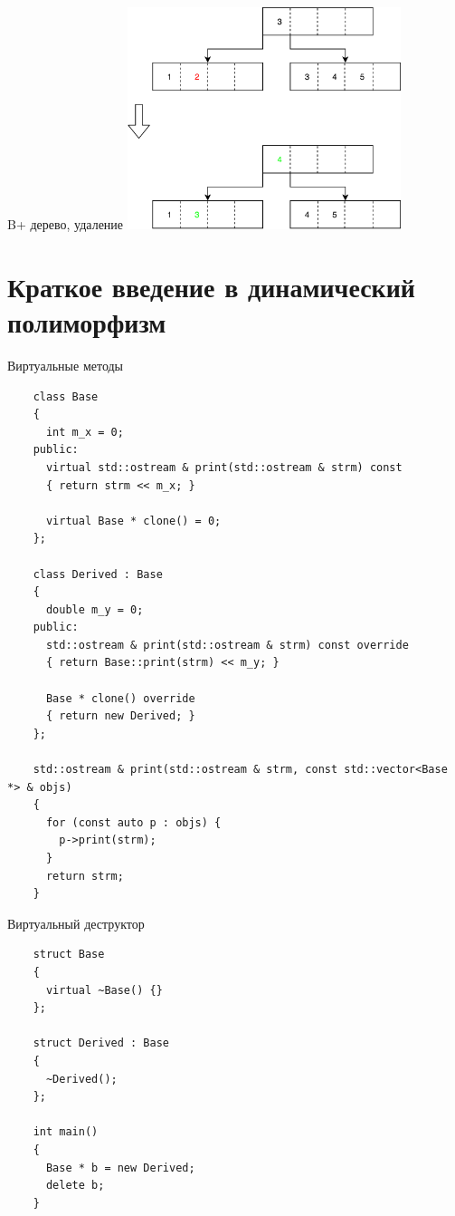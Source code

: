 \documentclass[unknownkeysallowed,xcolor=table]{beamer}
\begin{document}
\begin{frame}{B+ дерево, удаление}
  \includegraphics[align=c,width=8cm,keepaspectratio]{images/bptree_delete.png}
\end{frame}

\section{Краткое введение в динамический полиморфизм}

\begin{frame}[fragile]{Виртуальные методы}
  \begin{lstlisting}
    class Base
    {
      int m_x = 0;
    public:
      virtual std::ostream & print(std::ostream & strm) const
      { return strm << m_x; }

      virtual Base * clone() = 0;
    };

    class Derived : Base
    {
      double m_y = 0;
    public:
      std::ostream & print(std::ostream & strm) const override
      { return Base::print(strm) << m_y; }

      Base * clone() override
      { return new Derived; }
    };

    std::ostream & print(std::ostream & strm, const std::vector<Base *> & objs)
    {
      for (const auto p : objs) {
        p->print(strm);
      }
      return strm;
    }
  \end{lstlisting}
\end{frame}

\begin{frame}[fragile]{Виртуальный деструктор}
  \begin{lstlisting}
    struct Base
    {
      virtual ~Base() {}
    };

    struct Derived : Base
    {
      ~Derived();
    };

    int main()
    {
      Base * b = new Derived;
      delete b;
    }
  \end{lstlisting}
\end{frame}
\end{document}
